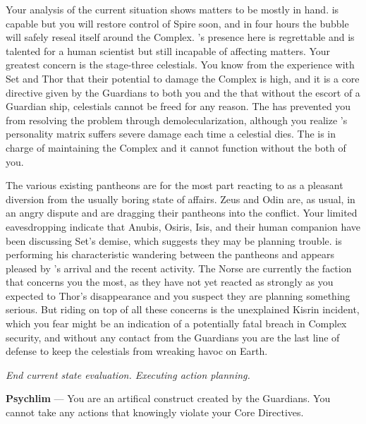 \documentclass[char]{guardians}
\begin{document}
Your analysis of the current situation shows matters to be mostly in hand. \cUnity{} is capable but you will restore control of Spire soon, and in four hours the bubble will safely reseal itself around the Complex. \cKachiko{}'s presence here is regrettable and \cKachiko{\they} is talented for a human scientist but still incapable of affecting matters. Your greatest concern is the stage-three celestials. You know from the experience with Set and Thor that their potential to damage the Complex is high, and it is a core directive given by the Guardians to both you and the \cCaretaker{} that without the escort of a Guardian ship, celestials cannot be freed for any reason. The \cCaretaker{} has prevented you from resolving the problem through demolecularization, although you realize \cCaretaker{}'s personality matrix suffers severe damage each time a celestial dies. The \cCaretaker{} is in charge of maintaining the Complex and it cannot function without the both of you.

The various existing pantheons are for the most part reacting to \cUnity{} as a pleasant diversion from the usually boring state of affairs. Zeus and Odin are, as usual, in an angry dispute and are dragging their pantheons into the conflict. Your limited eavesdropping indicate that Anubis, Osiris, Isis, and their human companion \cEgyptianHuman{} have been discussing Set's demise, which suggests they may be planning trouble. \cJascha{} is performing his characteristic wandering between the pantheons and appears pleased by \cUnity{}'s arrival and the recent activity. The Norse are currently the faction that concerns you the most, as they have not yet reacted as strongly as you expected to Thor's disappearance and you suspect they are planning something serious. But riding on top of all these concerns is the unexplained Kisrin incident, which you fear might be an indication of a potentially fatal breach in Complex security, and without any contact from the Guardians you are the last line of defense to keep the celestials from wreaking havoc on Earth.

\emph{End current state evaluation. Executing action planning.}

\begin{itemz}[Notes]
  \item \textbf{Psychlim} --- You are an artifical construct created by the Guardians. You cannot take any actions that knowingly violate your Core Directives.
\end{itemz}
\end{document}
